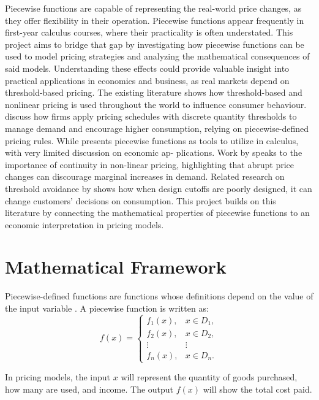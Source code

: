 \documentclass{article}
\begin{document}
Piecewise functions are capable of representing the real-world price changes, as they offer flexibility in their operation.
Piecewise functions appear frequently in first-year calculus courses, where their practicality is often understated. This project aims to bridge that gap by investigating how piecewise functions can be used to model pricing strategies and analyzing the mathematical consequences of said models. Understanding these effects could provide valuable insight into practical applications in economics and business, as real markets depend on threshold-based pricing. The existing literature shows how threshold-based and nonlinear pricing is used throughout the world to influence consumer behaviour. 
\textcite{K2017} discuss how firms apply pricing schedules with discrete quantity thresholds to manage demand and encourage higher consumption, relying on piecewise-defined pricing rules. While \textcite{Stewart2021}presents piecewise functions as tools to utilize in calculus, with very limited discussion on economic ap-
plications. Work by
\textcite{radic2024} speaks to the importance of continuity in non-linear pricing, highlighting that abrupt price changes can discourage marginal increases in demand. Related research on threshold avoidance by \textcite{Lehner2025} shows how when design cutoffs are poorly designed, it can change customers’ decisions on consumption. This project builds on this literature by connecting the mathematical properties of piecewise functions to an economic interpretation in pricing models.


\section{Mathematical Framework}
Piecewise-defined functions are functions whose definitions depend on the value of the input variable \textcite{Stewart2021}. A piecewise function is written as:
\begin{equation*}
f(x) =
\begin{cases}
f_1(x), & x \in D_1, \\
f_2(x), & x \in D_2, \\
\vdots  & \vdots \\
f_n(x), & x \in D_n.
\end{cases}
\end{equation*}

In pricing models, the input $x$ will represent the quantity of goods purchased, how many are used, and income. The output $f(x)$ will show the total cost paid.
\end{document}
